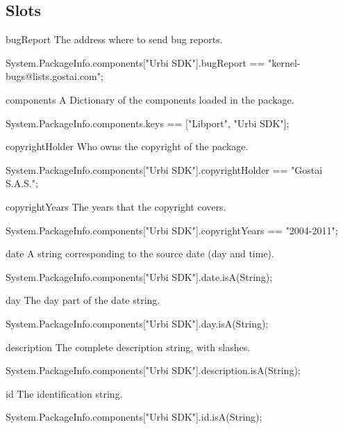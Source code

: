 \subsection{Slots}
\begin{urbiscriptapi}
\item[bugReport] The address where to send bug reports.
\begin{urbiassert}
System.PackageInfo.components["Urbi SDK"].bugReport
  == "kernel-bugs@lists.gostai.com";
\end{urbiassert}

\item[components] A Dictionary of the components loaded in the package.
\begin{urbiassert}
System.PackageInfo.components.keys == ["Libport", "Urbi SDK"];
\end{urbiassert}

\item[copyrightHolder] Who owns the copyright of the package.
\begin{urbiassert}
System.PackageInfo.components["Urbi SDK"].copyrightHolder
  == "Gostai S.A.S.";
\end{urbiassert}

\item[copyrightYears] The years that the copyright covers.
\begin{urbiassert}
System.PackageInfo.components["Urbi SDK"].copyrightYears
  == "2004-2011";
\end{urbiassert}

\item[date] A string corresponding to the source date (day and time).
\begin{urbiassert}
System.PackageInfo.components["Urbi SDK"].date.isA(String);
\end{urbiassert}

\item[day] The day part of the date string.
\begin{urbiassert}
System.PackageInfo.components["Urbi SDK"].day.isA(String);
\end{urbiassert}

\item[description] The complete description string, with slashes.
\begin{urbiassert}
System.PackageInfo.components["Urbi SDK"].description.isA(String);
\end{urbiassert}

\item[id] The identification string.
\begin{urbiassert}
System.PackageInfo.components["Urbi SDK"].id.isA(String);
\end{urbiassert}


\end{urbiscriptapi}
